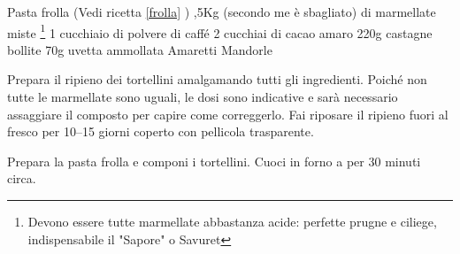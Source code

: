 \begin{ingreds}
	Pasta frolla (Vedi ricetta \ref{frolla} )
	,5Kg (secondo me è sbagliato) di marmellate miste  \footnote{Devono essere tutte marmellate abbastanza acide: perfette prugne e ciliege, indispensabile il "Sapore" o Savuret}
	1 cucchiaio di polvere di caffé 
	2 cucchiai di cacao amaro 
	220g castagne bollite 
	70g uvetta ammollata 
	Amaretti 
	Mandorle 



\end{ingreds}

\begin{method}
Prepara il ripieno dei tortellini amalgamando tutti gli ingredienti. Poiché non tutte le marmellate sono uguali, le dosi sono indicative e sarà necessario assaggiare il composto per capire come correggerlo. Fai riposare il ripieno fuori al fresco per 10--15 giorni coperto con pellicola trasparente.

	Prepara la pasta frolla e componi i tortellini. Cuoci in forno a  per 30 minuti circa.


\end{method}




